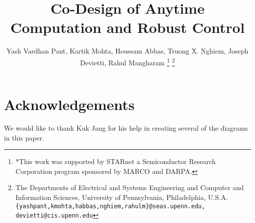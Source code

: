 \documentclass[10pt, conference, compsocconf]{IEEEtran}
\begin{document}
\title{\LARGE \bf
Co-Design of Anytime Computation and Robust Control
}
%
\author{Yash Vardhan Pant, Kartik Mohta, Houssam Abbas, Truong X. Nghiem, Joseph Devietti, Rahul Mangharam%
\thanks{*This work was supported by STARnet a Semiconductor Research
Corporation program sponsored by MARCO and DARPA.}%
\thanks{The Departments of Electrical and Systems Engineering and Computer and Information Sciences, University of Pennsylvania, Philadelphia, U.S.A.
        {\tt\small
        \{yashpant,kmohta,habbas,nghiem,rahulm\}@seas.upenn.edu, devietti@cis.upenn.edu}}%
}







\maketitle
\thispagestyle{empty}
\pagestyle{empty}

{
	
		
}
{
	
	
	
	
	
	
	
	
	
	
	\section*{Acknowledgements}
	We would like to thank Kuk Jang for his help in creating several of the diagrams in this paper.
	

}
\end{document}
